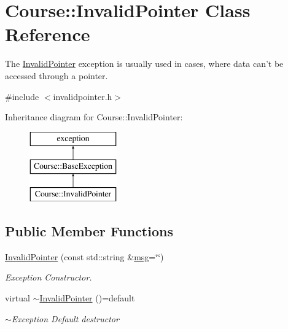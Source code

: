 \hypertarget{classCourse_1_1InvalidPointer}{\section{Course\-:\-:Invalid\-Pointer Class Reference}
\label{classCourse_1_1InvalidPointer}
}


The \hyperlink{classCourse_1_1InvalidPointer}{Invalid\-Pointer} exception is usually used in cases, where data can't be accessed through a pointer.  




{\ttfamily \#include $<$invalidpointer.\-h$>$}

Inheritance diagram for Course\-:\-:Invalid\-Pointer\-:\begin{figure}[H]
\begin{center}
\leavevmode
\includegraphics[height=3.000000cm]{classCourse_1_1InvalidPointer}
\end{center}
\end{figure}
\subsection*{Public Member Functions}
\begin{DoxyCompactItemize}
\item 
\hyperlink{classCourse_1_1InvalidPointer_a50e19c157520ba167d71e0c2a2ef5e08}{Invalid\-Pointer} (const std\-::string \&\hyperlink{classCourse_1_1BaseException_ac5a744a6af6f2ba9198b58e52bb62f5a}{msg}=\char`\"{}\char`\"{})
\begin{DoxyCompactList}\small\item\em Exception Constructor. \end{DoxyCompactList}\item 
virtual \hyperlink{classCourse_1_1InvalidPointer_a810f843d49a0fc64dfedddbe4a1e447e}{$\sim$\-Invalid\-Pointer} ()=default
\begin{DoxyCompactList}\small\item\em $\sim$\-Exception Default destructor \end{DoxyCompactList}\end{DoxyCompactItemize}


